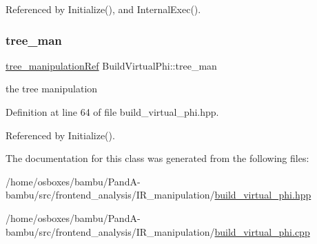Referenced by Initialize(), and Internal\+Exec().

\mbox{\label{classBuildVirtualPhi_adc82c90118858d6c7fa2ac3c909995ac}} 
\subsubsection{\texorpdfstring{tree\+\_\+man}{tree\_man}}
{\footnotesize\ttfamily \hyperlink{tree__manipulation_8hpp_a1a9460e3a2f9fc6a96cfd2f24cc9b2a5}{tree\+\_\+manipulation\+Ref} Build\+Virtual\+Phi\+::tree\+\_\+man\hspace{0.3cm}{\ttfamily [private]}}



the tree manipulation 



Definition at line 64 of file build\+\_\+virtual\+\_\+phi.\+hpp.



Referenced by Initialize().



The documentation for this class was generated from the following files\+:\begin{DoxyCompactItemize}
\item 
/home/osboxes/bambu/\+Pand\+A-\/bambu/src/frontend\+\_\+analysis/\+I\+R\+\_\+manipulation/\hyperlink{build__virtual__phi_8hpp}{build\+\_\+virtual\+\_\+phi.\+hpp}\item 
/home/osboxes/bambu/\+Pand\+A-\/bambu/src/frontend\+\_\+analysis/\+I\+R\+\_\+manipulation/\hyperlink{build__virtual__phi_8cpp}{build\+\_\+virtual\+\_\+phi.\+cpp}\end{DoxyCompactItemize}
